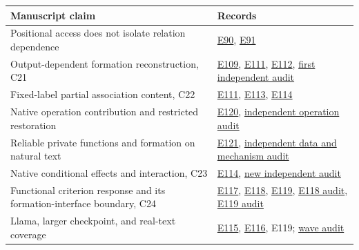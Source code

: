 \documentclass[11pt]{article}
\begin{document}
\begin{table}[t]
\small
\begin{tabularx}{\textwidth}{>{\raggedright\arraybackslash}X>{\raggedleft\arraybackslash}X}
\toprule
Manuscript claim & Records \\
\midrule
Positional access does not isolate relation dependence & \href{experiments/E90-source-isolation-before-and-after.md}{E90}, \href{experiments/E91-label-namespace-and-inherited-rule.md}{E91} \\
Output-dependent formation reconstruction, C21 & \href{experiments/E109-foreign-messages-at-label-formation.md}{E109}, \href{experiments/E111-polarity-relation-versus-namespace.md}{E111}, \href{experiments/E112-formation-mechanism-mistral-family.md}{E112}, \href{results/e109/independent_review_2026-10-11.md}{first independent audit} \\
Fixed-label partial association content, C22 & \href{experiments/E111-polarity-relation-versus-namespace.md}{E111}, \href{experiments/E113-relation-content-mistral.md}{E113}, \href{experiments/E114-native-formation-reading-crossing.md}{E114} \\
Native operation contribution and restricted restoration & \href{experiments/E120-operation-necessity.md}{E120}, \href{results/e120/independent_review_2026-10-12.md}{independent operation audit} \\
Reliable private functions and formation on natural text & \href{experiments/E121-natural-sentiment-mechanism.md}{E121}, \href{results/e121/independent_review_2026-10-12.md}{independent data and mechanism audit} \\
Native conditional effects and interaction, C23 & \href{experiments/E114-native-formation-reading-crossing.md}{E114}, \href{results/e114/independent_review_2026-10-11.md}{new independent audit} \\
Functional criterion response and its formation-interface boundary, C24 & \href{experiments/E117-criterion-feature-formation.md}{E117}, \href{experiments/E118-criterion-code-feature-crossing.md}{E118}, \href{experiments/E119-stronger-model-formation-criterion.md}{E119}, \href{results/e118/independent_review_2026-10-11.md}{E118 audit}, \href{results/e119/independent_review_2026-10-11.md}{E119 audit} \\
Llama, larger checkpoint, and real-text coverage & \href{experiments/E115-llama-frozen-native-mechanism.md}{E115}, \href{experiments/E116-native-mhs-formation-reading.md}{E116}, E119; \href{results/e117/independent_review_2026-10-11.md}{wave audit} \\

\end{tabularx}
\end{table}
\end{document}
